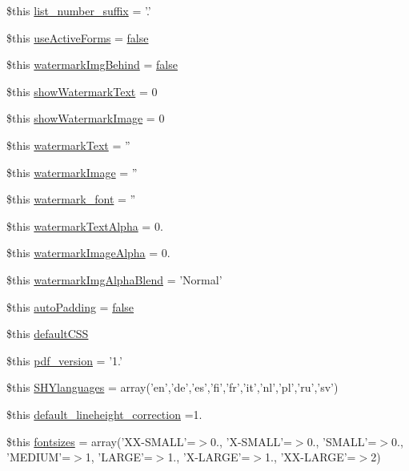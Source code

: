 \begin{DoxyCompactItemize}
\item 
\$this \hyperlink{config_8php_af6ad73549a4b10d15c7b6cc3380e5681}{list\-\_\-number\-\_\-suffix} = '.'
\item 
\$this \hyperlink{config_8php_af55402cb8c041a80acb44b819e344401}{use\-Active\-Forms} = \hyperlink{ttfontsuni_8php_afbaa04e5cc97693dc668b3c45d3dd740}{false}
\item 
\$this \hyperlink{config_8php_a14151ee6d472a768e92d4f9130831727}{watermark\-Img\-Behind} = \hyperlink{ttfontsuni_8php_afbaa04e5cc97693dc668b3c45d3dd740}{false}
\item 
\$this \hyperlink{config_8php_acd507265c6a9c2aac1f8e397f384c514}{show\-Watermark\-Text} = 0
\item 
\$this \hyperlink{config_8php_acf240bbb506618e1ed068b32d93d1a94}{show\-Watermark\-Image} = 0
\item 
\$this \hyperlink{config_8php_aeb7a44f5b9bb8f22ff1f80cae7d4a778}{watermark\-Text} = ''
\item 
\$this \hyperlink{config_8php_a579029f1a6c08d56833da40ef27488a8}{watermark\-Image} = ''
\item 
\$this \hyperlink{config_8php_a637c5994b2640277dd0dd20741214498}{watermark\-\_\-font} = ''
\item 
\$this \hyperlink{config_8php_ae9c2d78b34fcbc818fdcfac2f0fff4c4}{watermark\-Text\-Alpha} = 0.
\item 
\$this \hyperlink{config_8php_a8a0d522d96d96ab665d92a62b2cf764b}{watermark\-Image\-Alpha} = 0.
\item 
\$this \hyperlink{config_8php_a24cb17138e1c20b87767d70fdea55e2b}{watermark\-Img\-Alpha\-Blend} = 'Normal'
\item 
\$this \hyperlink{config_8php_a44467dd3722584e4e362e081f16caf23}{auto\-Padding} = \hyperlink{ttfontsuni_8php_afbaa04e5cc97693dc668b3c45d3dd740}{false}
\item 
\$this \hyperlink{config_8php_adc1dd9449d51b8099d382dd3e1fc568e}{default\-C\-S\-S}
\item 
\$this \hyperlink{config_8php_aaa2874721f5bf2ae96787cd0cda1a2df}{pdf\-\_\-version} = '1.'
\item 
\$this \hyperlink{config_8php_a16472c453c561d44bf20f26567699a34}{S\-H\-Ylanguages} = array('en','de','es','fi','fr','it','nl','pl','ru','sv')
\item 
\$this \hyperlink{config_8php_aab4a33eb2b243a7ffdebd0f48edf18d5}{default\-\_\-lineheight\-\_\-correction} =1.
\item 
\$this \hyperlink{config_8php_a63a6e1dc15845eaeb2775706e40dd49d}{fontsizes} = array('X\-X-\/S\-M\-A\-L\-L'=$>$0., 'X-\/S\-M\-A\-L\-L'=$>$0., 'S\-M\-A\-L\-L'=$>$0., 'M\-E\-D\-I\-U\-M'=$>$1, 'L\-A\-R\-G\-E'=$>$1., 'X-\/L\-A\-R\-G\-E'=$>$1., 'X\-X-\/L\-A\-R\-G\-E'=$>$2)

\end{DoxyCompactItemize}
